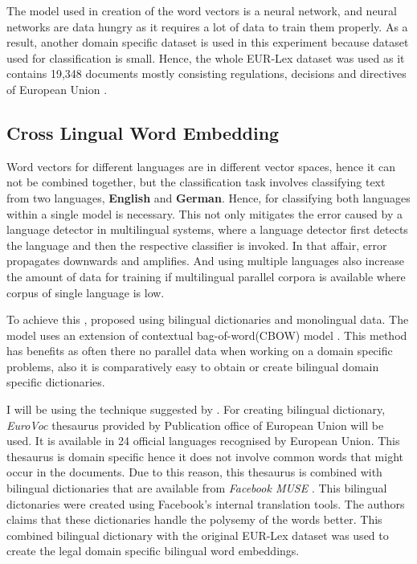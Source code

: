 
The model used in creation of the word vectors is a neural network, and neural networks are data hungry as it requires a lot of data to train them properly. As a result, another domain specific dataset is used in this experiment because dataset used for classification is small. Hence, the whole EUR-Lex dataset was used as it contains 19,348 documents mostly consisting regulations, decisions and directives of European Union \cite{jf:SemanticLaw}.

\subsection{Cross Lingual Word Embedding}\label{backgroundCrosslingual}
Word vectors for different languages are in different vector spaces, hence it can not be combined together, but the classification task involves classifying text from two languages, \textbf{English} and \textbf{German}. Hence, for classifying both languages within a single model is necessary. This not only mitigates the error caused by a language detector in multilingual systems, where a language detector first detects the language and then the respective classifier is invoked. In that affair, error propagates downwards and amplifies. And using multiple languages also increase the amount of data for training if multilingual parallel corpora is available where corpus of single language is low. 

To achieve this \cite{duong-EtAl:2016:EMNLP}, proposed using bilingual dictionaries and monolingual data. The model uses an extension of contextual bag-of-word(CBOW) model \cite{mikolov2013efficient}. This method has benefits as often there no parallel data when working on a domain specific problems, also it is comparatively easy to obtain or create bilingual domain specific dictionaries. 

I will be using the technique suggested by \cite{duong-EtAl:2016:EMNLP}. For creating bilingual dictionary, \textit{EuroVoc} thesaurus \cite{steinberger2002cross} provided by Publication office of European Union will be used. It is available in 24 official languages recognised by European Union. This thesaurus is domain specific hence it does not involve common words that might occur in the documents. Due to this reason, this thesaurus is combined with bilingual dictionaries that are available from \textit{Facebook MUSE} \cite{conneau2017word}. This bilingual dictonaries were created using Facebook's internal translation tools. The authors claims that these dictionaries handle the polysemy of the words better. This combined bilingual dictionary with the original EUR-Lex dataset was used to create the legal domain specific bilingual word embeddings. 

